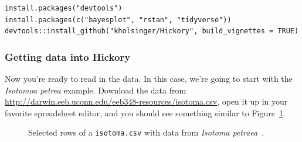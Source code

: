 \begin{verbatim}
install.packages("devtools")
install.packages(c("bayesplot", "rstan", "tidyverse"))
devtools::install_github("kholsinger/Hickory", build_vignettes = TRUE)
\end{verbatim}

\subsubsection*{Getting data into Hickory}

Now you're ready to read in the data. In this case, we're going to
start with the {\it Isotomoa petrea\/} example. Download the data from
\url{http://darwin.eeb.uconn.edu/eeb348-resources/isotoma.csv}, open
it up in your favorite spreadsheet editor, and you should see
something similar to Figure~\ref{fig:isotoma-csv}.

\begin{figure}
  \begin{center}
  \end{center}
\caption{Selected rows of a {\tt isotoma.csv} with data from {\it
    Isotoma petraea}~\cite{James-etal-1983}.}\label{fig:isotoma-csv}
\end{figure}

